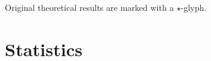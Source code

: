 \documentclass[
	twoside=false, %
]{kaobook}
\begin{document}
Original theoretical results are marked with a $\star$-glyph. 






\section{Statistics}
\label{sec:statistics}
\end{document}
